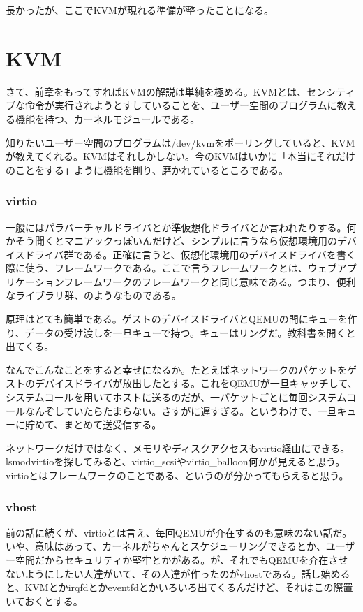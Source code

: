 \documentclass[9pt,b5paper,tombo]{jsbook}
\begin{document}
長かったが、ここでKVMが現れる準備が整ったことになる。

\section{KVM}

さて、前章をもってすればKVMの解説は単純を極める。KVMとは、センシティブな命令が実行されようとすしていることを、ユーザー空間のプログラムに教える機能を持つ、カーネルモジュールである。

知りたいユーザー空間のプログラムは/dev/kvmをポーリングしていると、KVMが教えてくれる。KVMはそれしかしない。今のKVMはいかに「本当にそれだけのことをする」ように機能を削り、磨かれているところである。

\subsubsection{virtio}

一般にはパラバーチャルドライバとか準仮想化ドライバとか言われたりする。何かそう聞くとマニアックっぽいんだけど、シンプルに言うなら仮想環境用のデバイスドライバ群である。正確に言うと、仮想化環境用のデバイスドライバを書く際に使う、フレームワークである。ここで言うフレームワークとは、ウェブアプリケーションフレームワークのフレームワークと同じ意味である。つまり、便利なライブラリ群、のようなものである。

原理はとても簡単である。ゲストのデバイスドライバとQEMUの間にキューを作り、データの受け渡しを一旦キューで持つ。キューはリングだ。教科書を開くと出てくる。

なんでこんなことをすると幸せになるか。たとえばネットワークのパケットをゲストのデバイスドライバが放出したとする。これをQEMUが一旦キャッチして、システムコールを用いてホストに送るのだが、一パケットごとに毎回システムコールなんぞしていたらたまらない。さすがに遅すぎる。というわけで、一旦キューに貯めて、まとめて送受信する。

ネットワークだけではなく、メモリやディスクアクセスもvirtio経由にできる。lsmodvirtioを探してみると、virtio\_scsiやvirtio\_balloon何かが見えると思う。virtioとはフレームワークのことである、というのが分かってもらえると思う。

\subsubsection{vhost}

前の話に続くが、virtioとは言え、毎回QEMUが介在するのも意味のない話だ。いや、意味はあって、カーネルがちゃんとスケジューリングできるとか、ユーザー空間だからセキュリティか堅牢とかがある。が、それでもQEMUを介在させないようにしたい人達がいて、その人達が作ったのがvhostである。話し始めると、KVMとかirqfdとかeventfdとかいろいろ出てくるんだけど、それはこの際置いておくとする。
\end{document}
